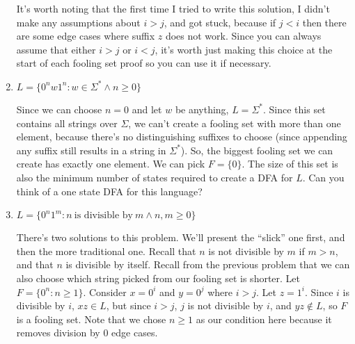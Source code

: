\documentclass[fleqn]{article}
\begin{document}
\begin{enumerate}
\begin{answer}
        It's worth noting that the first time I tried to write this solution, I didn't make any assumptions about $i > j$, and got stuck, because if $j < i$ then there are some edge cases where suffix $z$ does not work. Since you can always assume that either $i > j$ or $i < j$, it's worth just making this choice at the start of each fooling set proof so you can use it if necessary.
    \end{answer}
    \item $L = \{0^n w 1^n : w \in \Sigma^* \wedge n \geq 0\}$
    \begin{answer}
        Since we can choose $n = 0$ and let $w$ be anything, $L = \Sigma^*$. Since this set contains all strings over $\Sigma$, we can't create a fooling set with more than one element, because there's no distinguishing suffixes to choose (since appending any suffix still results in a string in $\Sigma^*$). So, the biggest fooling set we can create has exactly one element. We can pick $\boxed{F = \{0\}}$. The size of this set is also the minimum number of states required to create a DFA for $L$. Can you think of a one state DFA for this language?
    \end{answer}
    \item $L = \{0^n 1^m : n~\text{is divisible by}~m \wedge n,m \geq 0\}$
    \begin{answer}
        There's two solutions to this problem. We'll present the ``slick'' one first, and then the more traditional one. Recall that $n$ is not divisible by $m$ if $m > n$, and that $n$ is divisible by itself. Recall from the previous problem that we can also choose which string picked from our fooling set is shorter. Let $\boxed{F = \{0^n : n \geq 1\}}$. Consider $x = 0^i$ and $y = 0^j$ where $i > j$. Let $z = 1^i$. Since $i$ is divisible by $i$, $xz \in L$, but since $i > j$, $j$ is not divisible by $i$, and $yz \notin L$, so $F$ is a fooling set. Note that we chose $n \geq 1$ as our condition here because it removes division by $0$ edge cases.


\end{answer}
\end{enumerate}
\end{document}
